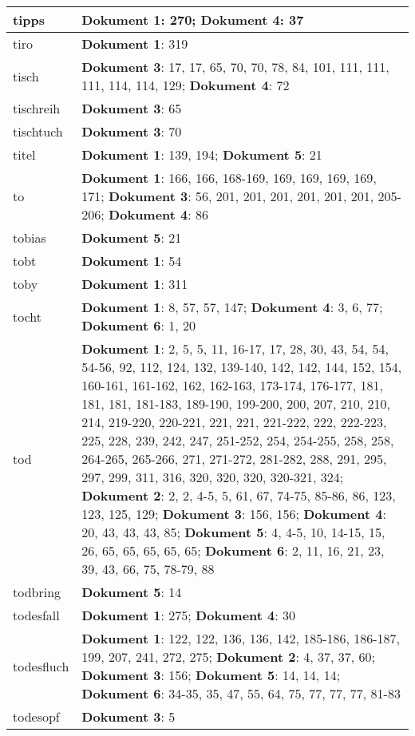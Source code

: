 \documentclass[a5paper]{article}
\begin{document}
\begin{longtable}[l]{|l|p{3in}|}
\hline
tipps & \textbf{Dokument 1}: 270; \textbf{Dokument 4}: 37 \\
\hline
tiro & \textbf{Dokument 1}: 319 \\
\hline
tisch & \textbf{Dokument 3}: 17, 17, 65, 70, 70, 78, 84, 101, 111, 111, 111, 114, 114, 129; \textbf{Dokument 4}: 72 \\
\hline
tischreih & \textbf{Dokument 3}: 65 \\
\hline
tischtuch & \textbf{Dokument 3}: 70 \\
\hline
titel & \textbf{Dokument 1}: 139, 194; \textbf{Dokument 5}: 21 \\
\hline
to & \textbf{Dokument 1}: 166, 166, 168-169, 169, 169, 169, 169, 171; \textbf{Dokument 3}: 56, 201, 201, 201, 201, 201, 201, 205-206; \textbf{Dokument 4}: 86 \\
\hline
tobias & \textbf{Dokument 5}: 21 \\
\hline
tobt & \textbf{Dokument 1}: 54 \\
\hline
toby & \textbf{Dokument 1}: 311 \\
\hline
tocht & \textbf{Dokument 1}: 8, 57, 57, 147; \textbf{Dokument 4}: 3, 6, 77; \textbf{Dokument 6}: 1, 20 \\
\hline
tod & \textbf{Dokument 1}: 2, 5, 5, 11, 16-17, 17, 28, 30, 43, 54, 54, 54-56, 92, 112, 124, 132, 139-140, 142, 142, 144, 152, 154, 160-161, 161-162, 162, 162-163, 173-174, 176-177, 181, 181, 181, 181-183, 189-190, 199-200, 200, 207, 210, 210, 214, 219-220, 220-221, 221, 221, 221-222, 222, 222-223, 225, 228, 239, 242, 247, 251-252, 254, 254-255, 258, 258, 264-265, 265-266, 271, 271-272, 281-282, 288, 291, 295, 297, 299, 311, 316, 320, 320, 320, 320-321, 324; \textbf{Dokument 2}: 2, 2, 4-5, 5, 61, 67, 74-75, 85-86, 86, 123, 123, 125, 129; \textbf{Dokument 3}: 156, 156; \textbf{Dokument 4}: 20, 43, 43, 43, 85; \textbf{Dokument 5}: 4, 4-5, 10, 14-15, 15, 26, 65, 65, 65, 65, 65; \textbf{Dokument 6}: 2, 11, 16, 21, 23, 39, 43, 66, 75, 78-79, 88 \\
\hline
todbring & \textbf{Dokument 5}: 14 \\
\hline
todesfall & \textbf{Dokument 1}: 275; \textbf{Dokument 4}: 30 \\
\hline
todesfluch & \textbf{Dokument 1}: 122, 122, 136, 136, 142, 185-186, 186-187, 199, 207, 241, 272, 275; \textbf{Dokument 2}: 4, 37, 37, 60; \textbf{Dokument 3}: 156; \textbf{Dokument 5}: 14, 14, 14; \textbf{Dokument 6}: 34-35, 35, 47, 55, 64, 75, 77, 77, 77, 81-83 \\
\hline
todesopf & \textbf{Dokument 3}: 5 \\

\end{longtable}
\end{document}
